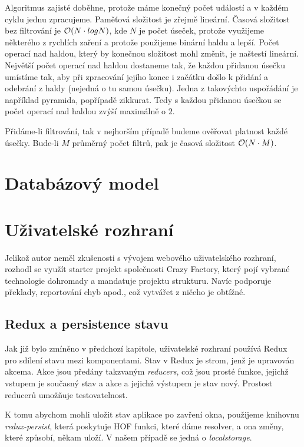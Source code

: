 Algoritmus zajisté doběhne, protože máme konečný počet událostí a v každém cyklu jednu zpracujeme.
Paměťová složitost je zřejmě lineární. Časová složitost bez filtrování je ${\cal O}(N\cdot{logN})$, kde $N$ je 
počet úseček, protože
využijeme některého z rychlích zaření a protože použijeme binární haldu a lepší. Počet operací nad haldou,
který by konečnou složitost mohl změnit, je naštestí lineární. Největší počet operací nad haldou dostaneme tak, že
každou přidanou úsečku umístíme tak, aby při zpracování jejího konce i začátku došlo k přidání a odebrání z haldy
(nejedná o tu samou úsečku). Jedna z takovýchto uspořádání je například pyramida, popřípadě zikkurat.
Tedy s každou přidanou úsečkou se počet operací nad haldou zvýší maximálně o $2$.

Přidáme-li filtrování, tak v nejhorším případě budeme ověřovat platnost každé úsečky. Bude-li $M$ průměrný počet
filtrů, pak je časová složitost ${\cal O}(N\cdot{M})$. 

\section{Databázový model}

\section{Uživatelské rozhraní}

Jelikož autor neměl zkušenosti s vývojem webového uživatelského rozhraní, rozhodl se využít starter projekt
společnosti Crazy Factory, který pojí vybrané technologie dohromady a mandatuje projektu strukturu.
Navíc podporuje překlady, reportování chyb apod., což vytvářet z ničeho je obtížné. \citep[viz][]{CFProj}

\subsection{Redux a persistence stavu}

Jak již bylo zmíněno v předchozí kapitole, uživatelské rozhraní používá Redux pro sdílení stavu mezi komponentami.
Stav v Redux je strom, jenž je upravován akcema. Akce jsou předány takzvaným \textit{reducers}, což jsou prosté funkce,
jejichž vstupem je současný stav a akce a jejichž výstupem je stav nový. \citep[viz][]{ReduxCore}
Prostost reducerů umožňuje testovatelnost.

K tomu abychom mohli uložit stav aplikace po zavření okna, použijeme knihovnu \textit{redux-persist}, která poskytuje
HOF funkci, které dáme resolver, a ona změny, které způsobí, někam uloží. V našem případě se jedná o \textit{localstorage}.

